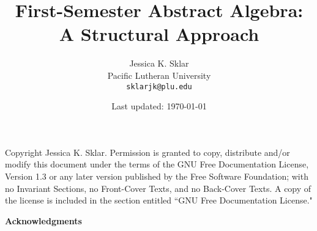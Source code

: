 \documentclass[openany, oneside]{book}
\begin{document}
\newtheorem{thm}{Theorem}[chapter]
\newtheorem{lem}[thm]{Lemma}
\newtheorem{cor}[thm]{Corollary}
\newtheorem{ex}[thm]{Example}

\newenvironment{example}[1]
  {\begin{ex}\label{#1}\rm}
  {\medskip \end{ex}}

\theoremstyle{plain} %
\newcommand{\defhead}{}
\newtheorem*{gendef*}{\defhead}
\newenvironment{df}[1]
  {\renewcommand{\defhead}{#1}%
   \begin{gendef*}\rm}
  {\end{gendef*}}





\title{First-Semester Abstract Algebra:\\ A Structural Approach}
\author{Jessica K. Sklar\\Pacific Lutheran University\\
\texttt{sklarjk{@}plu.edu}}
\date{Last updated: \today}

\hypersetup{pageanchor=false}
\maketitle
\hypersetup{pageanchor=true}

\frontmatter

\thispagestyle{empty}
\null \vfill
\noindent Copyright   Jessica K. Sklar. Permission is granted to copy, distribute and/or
modify this document under the terms of the GNU Free Documentation License,
Version 1.3 or any later version published by the Free Software Foundation; with no
Invariant Sections, no Front-Cover Texts, and no Back-Cover Texts. A copy of the
license is included in the section entitled ``GNU Free Documentation License."
\vfill \vfill

\pagebreak

{}
\null \vfill


\begin{center}\textbf{\huge Acknowledgments} \end{center}
\end{document}
